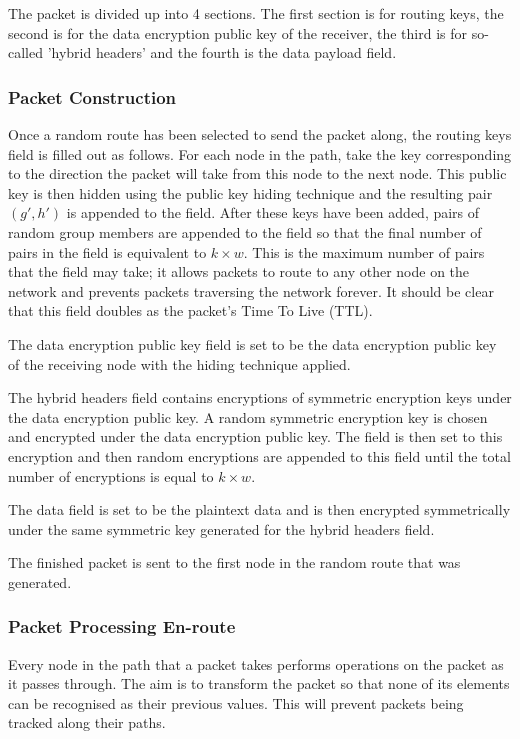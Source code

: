 \documentclass[ %
                    author={Luke Murray},
                supervisor={Dr. Simon Hollis},
                     title={Shadow Peer-to-Peer Networks},
                  subtitle={},
                    degree={MEng},
                      year={2013} ]{thesis}
\begin{document}
The packet is divided up into 4 sections. The first section is for routing keys, the second is for the data encryption public key of the receiver, the third is for so-called 'hybrid headers' and the fourth is the data payload field.

\subsubsection{Packet Construction}

Once a random route has been selected to send the packet along, the routing keys field is filled out as follows. For each node in the path, take the key corresponding to the direction the packet will take from this node to the next node. This public key is then hidden using the public key hiding technique and the resulting pair $(g\prime, h\prime)$ is appended to the field. After these keys have been added, pairs of random group members are appended to the field so that the final number of pairs in the field is equivalent to $k \times w$. This is the maximum number of pairs that the field may take; it allows packets to route to any other node on the network and prevents packets traversing the network forever. It should be clear that this field doubles as the packet's Time To Live (TTL).

The data encryption public key field is set to be the data encryption public key of the receiving node with the hiding technique applied.

The hybrid headers field contains encryptions of symmetric encryption keys under the data encryption public key. A random symmetric encryption key is chosen and encrypted under the data encryption public key. The field is then set to this encryption and then random encryptions are appended to this field until the total number of encryptions is equal to $k \times w$.

The data field is set to be the plaintext data and is then encrypted symmetrically under the same symmetric key generated for the hybrid headers field.

The finished packet is sent to the first node in the random route that was generated.

\subsubsection{Packet Processing En-route}

Every node in the path that a packet takes performs operations on the packet as it passes through. The aim is to transform the packet so that none of its elements can be recognised as their previous values. This will prevent packets being tracked along their paths.
\end{document}

